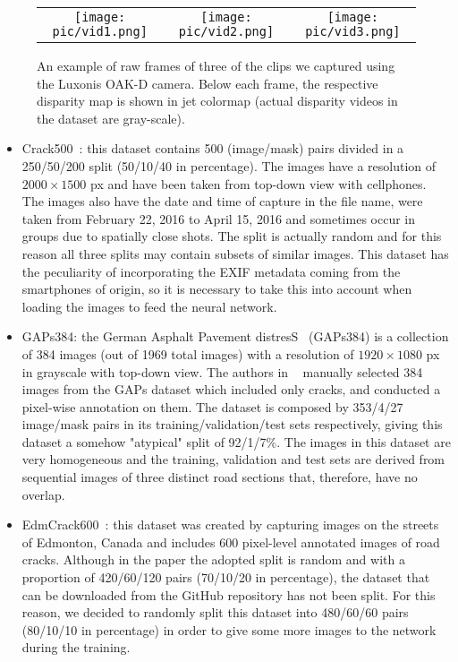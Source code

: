 \documentclass[twocolumn]{article}
\begin{document}
\begin{figure}
    \centering
    \setlength{\tabcolsep}{0pt}
    \begin{tabular}{ccc}
        \texttt{[image: pic/vid1.png]} &
        \texttt{[image: pic/vid2.png]} &
        \texttt{[image: pic/vid3.png]}
    \end{tabular}
    \caption{An example of raw frames of three of the clips we captured using the Luxonis OAK-D camera. Below each frame, the respective disparity map is shown in jet colormap (actual disparity videos in the dataset are gray-scale).}
    \label{fig:video_sample}
\end{figure}

\begin{itemize}
    \item Crack500~\cite{crack500_1,crack500_2}: this dataset contains 500 (image/mask) pairs divided in a 250/50/200 split (50/10/40 in percentage). The images have a resolution of $2000\times1500$ px and have been taken from top-down view with cellphones. The images also have the date and time of capture in the file name, were taken from February 22, 2016 to April 15, 2016 and sometimes occur in groups due to spatially close shots. The split is actually random and for this reason all three splits may contain subsets of similar images. This dataset has the peculiarity of incorporating the EXIF metadata coming from the smartphones of origin, so it is necessary to take this into account when loading the images to feed the neural network.
    \item GAPs384: the German Asphalt Pavement distresS~\cite{GAPs384_2} (GAPs384) is a collection of 384 images (out of 1969 total images) with a resolution of $1920\times1080$ px in grayscale with top-down view. The authors in ~\cite{crack500_2} manually selected 384 images from the GAPs dataset which included only cracks, and conducted a pixel-wise annotation on them. The dataset is composed by 353/4/27 image/mask pairs in its training/validation/test sets respectively, giving this dataset a somehow "atypical" split of 92/1/7\%. The images in this dataset are very homogeneous and the training, validation and test sets are derived from sequential images of three distinct road sections that, therefore, have no overlap.
    \item EdmCrack600~\cite{EdmCrack600_1,EdmCrack600_2,EdmCrack600_3}: this dataset was created by capturing images on the streets of Edmonton, Canada and includes 600 pixel-level annotated images of road cracks. Although in the paper the adopted split is random and with a proportion of 420/60/120 pairs (70/10/20 in percentage), the dataset that can be downloaded from the GitHub repository has not been split. For this reason, we decided to randomly split this dataset into 480/60/60 pairs (80/10/10 in percentage) in order to give some more images to the network during the training.

\end{itemize}
\end{document}
